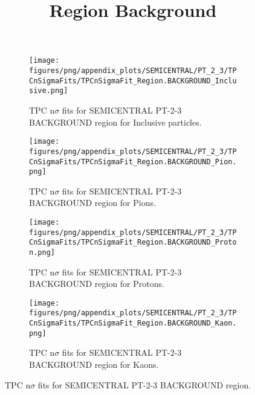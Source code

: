             \begin{figure}[H]
                \title{Region Background}
                \begin{subfigure}[b]{0.5\textwidth}
                    \centering
                    \texttt{[image: figures/png/appendix\_plots/SEMICENTRAL/PT\_2\_3/TPCnSigmaFits/TPCnSigmaFit\_Region.BACKGROUND\_Inclusive.png]}
                    \caption{TPC n$\sigma$ fits for SEMICENTRAL PT-2-3 BACKGROUND region for Inclusive particles.}
                    \label{fig:appendix_SEMICENTRAL_PT-2-3_BACKGROUND_Inclusive}
                \end{subfigure}
                \begin{subfigure}[b]{0.5\textwidth}
                    \centering
                    \texttt{[image: figures/png/appendix\_plots/SEMICENTRAL/PT\_2\_3/TPCnSigmaFits/TPCnSigmaFit\_Region.BACKGROUND\_Pion.png]}
                    \caption{TPC n$\sigma$ fits for SEMICENTRAL PT-2-3 BACKGROUND region for Pions.}
                    \label{fig:appendix_SEMICENTRAL_PT-2-3_BACKGROUND_Pion}
                \end{subfigure}
                \begin{subfigure}[b]{0.5\textwidth}
                    \centering
                    \texttt{[image: figures/png/appendix\_plots/SEMICENTRAL/PT\_2\_3/TPCnSigmaFits/TPCnSigmaFit\_Region.BACKGROUND\_Proton.png]}
                    \caption{TPC n$\sigma$ fits for SEMICENTRAL PT-2-3 BACKGROUND region for Protons.}
                    \label{fig:appendix_SEMICENTRAL_PT-2-3_BACKGROUND_Proton}
                \end{subfigure}
                \begin{subfigure}[b]{0.5\textwidth}
                    \centering
                    \texttt{[image: figures/png/appendix\_plots/SEMICENTRAL/PT\_2\_3/TPCnSigmaFits/TPCnSigmaFit\_Region.BACKGROUND\_Kaon.png]}
                    \caption{TPC n$\sigma$ fits for SEMICENTRAL PT-2-3 BACKGROUND region for Kaons.}
                    \label{fig:appendix_SEMICENTRAL_PT-2-3_BACKGROUND_Kaon}
                \end{subfigure}
                \caption{TPC n$\sigma$ fits for SEMICENTRAL PT-2-3 BACKGROUND region.}
                \label{fig:appendix_SEMICENTRAL_PT-2-3_BACKGROUND}
            \end{figure}
            \clearpage
            
    
